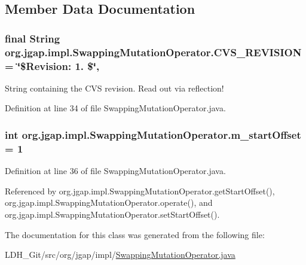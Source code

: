 \subsection{Member Data Documentation}
\hypertarget{classorg_1_1jgap_1_1impl_1_1_swapping_mutation_operator_a0ffd35f7d9b1437b5cb2c4bbcd3687de}{
\subsubsection[{C\-V\-S\-\_\-\-R\-E\-V\-I\-S\-I\-O\-N}]{\setlength{\rightskip}{0pt plus 5cm}final String org.\-jgap.\-impl.\-Swapping\-Mutation\-Operator.\-C\-V\-S\-\_\-\-R\-E\-V\-I\-S\-I\-O\-N = \char`\"{}\$Revision\-: 1. \$\char`\"{}\hspace{0.3cm}{\ttfamily [static]}, {\ttfamily [private]}}}\label{classorg_1_1jgap_1_1impl_1_1_swapping_mutation_operator_a0ffd35f7d9b1437b5cb2c4bbcd3687de}
String containing the C\-V\-S revision. Read out via reflection! 

Definition at line 34 of file Swapping\-Mutation\-Operator.\-java.

\hypertarget{classorg_1_1jgap_1_1impl_1_1_swapping_mutation_operator_a542b0fe73976a2e9f45cf45402127b39}{
\subsubsection[{m\-\_\-start\-Offset}]{\setlength{\rightskip}{0pt plus 5cm}int org.\-jgap.\-impl.\-Swapping\-Mutation\-Operator.\-m\-\_\-start\-Offset = 1\hspace{0.3cm}{\ttfamily [private]}}}\label{classorg_1_1jgap_1_1impl_1_1_swapping_mutation_operator_a542b0fe73976a2e9f45cf45402127b39}


Definition at line 36 of file Swapping\-Mutation\-Operator.\-java.



Referenced by org.\-jgap.\-impl.\-Swapping\-Mutation\-Operator.\-get\-Start\-Offset(), org.\-jgap.\-impl.\-Swapping\-Mutation\-Operator.\-operate(), and org.\-jgap.\-impl.\-Swapping\-Mutation\-Operator.\-set\-Start\-Offset().



The documentation for this class was generated from the following file\-:\begin{DoxyCompactItemize}
\item 
L\-D\-H\-\_\-\-Git/src/org/jgap/impl/\hyperlink{_swapping_mutation_operator_8java}{Swapping\-Mutation\-Operator.\-java}\end{DoxyCompactItemize}
